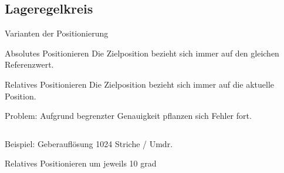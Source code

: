 \subsection[\thesection .\thesubsection \ 
Lageregelkreis]{Lageregelkreis}\label{sec:lageregelkreis}
%
%
\begin{frame}{Varianten der Positionierung}
%
\begin{block}{Absolutes Positionieren}
%
Die Zielposition bezieht sich immer auf den gleichen Referenzwert.
%
\end{block}
%
%
\begin{block}{Relatives Positionieren}
%
Die Zielposition bezieht sich immer auf die aktuelle Position.
%
\end{block}
%
\alert{Problem:} Aufgrund begrenzter  Genauigkeit pflanzen sich Fehler fort.
%
\begin{columns}[T]
%
%
\begin{block}{Beispiel:}
%
Geberauflösung 1024 Striche / Umdr.\ 

Relatives Positionieren um jeweils 10 grad
%
\end{block}
%

\vspace{12pt}

%

%

%
\end{columns}
%
\end{frame}